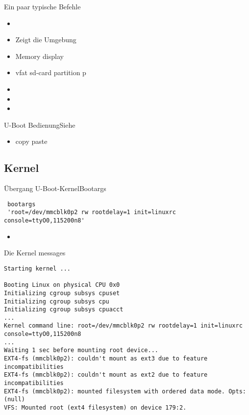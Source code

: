 \begin{frame}{Ein paar typische Befehle}
 \begin{itemize}
  \item {}
  \item {} Zeigt die Umgebung
  \item {} Memory display
  \item {}  vfat sd-card partition p
  \item {}
  \item {} 
  \item {}
 \end{itemize}
\end{frame}


\begin{frame}{U-Boot Bedienung}{Siehe }
 \begin{itemize}
  \item copy paste
 \end{itemize}
\end{frame}

\subsection{Kernel}
\begin{frame}[fragile]{Übergang U-Boot-Kernel}{Bootargs}
{\scriptsize
\begin{verbatim}
 bootargs 
 'root=/dev/mmcblk0p2 rw rootdelay=1 init=linuxrc console=ttyO0,115200n8'
\end{verbatim}
}
\begin{itemize}
 \item {}
\end{itemize}
\end{frame}

\begin{frame}[fragile]{Die Kernel messages}{}
{\scriptsize
\begin{verbatim}
Starting kernel ...

Booting Linux on physical CPU 0x0
Initializing cgroup subsys cpuset
Initializing cgroup subsys cpu
Initializing cgroup subsys cpuacct
...
Kernel command line: root=/dev/mmcblk0p2 rw rootdelay=1 init=linuxrc console=ttyO0,115200n8
...
Waiting 1 sec before mounting root device...
EXT4-fs (mmcblk0p2): couldn't mount as ext3 due to feature incompatibilities
EXT4-fs (mmcblk0p2): couldn't mount as ext2 due to feature incompatibilities
EXT4-fs (mmcblk0p2): mounted filesystem with ordered data mode. Opts: (null)
VFS: Mounted root (ext4 filesystem) on device 179:2.
\end{verbatim}
}
\end{frame}

